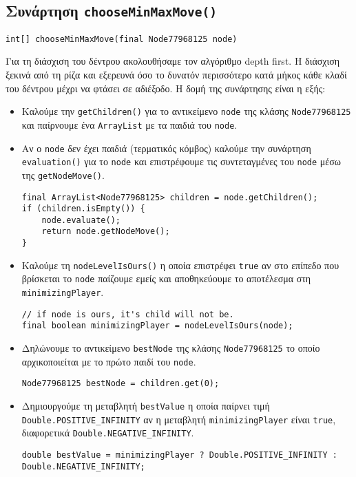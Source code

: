 \subsection{Συνάρτηση \texttt{chooseMinMaxMove()}}
\begin{lstlisting}[style=declaration]
int[] chooseMinMaxMove(final Node77968125 node)
\end{lstlisting}
Για τη διάσχιση του δέντρου ακολουθήσαμε τον αλγόριθμο depth first\cite{depth-first}.
Η διάσχιση ξεκινά από τη ρίζα και εξερευνά όσο το δυνατόν περισσότερο κατά μήκος κάθε κλαδί του δέντρου μέχρι να φτάσει σε αδιέξοδο.
Η δομή της συνάρτησης είναι η εξής:
\begin{itemize}
\item Καλούμε την \lstinline!getChildren()! για το αντικείμενο \lstinline!node! της κλάσης \lstinline!Node77968125! και παίρνουμε ένα
\lstinline!ArrayList! με τα παιδιά του \lstinline!node!.

\item Αν ο \lstinline!node! δεν έχει παιδιά (τερματικός κόμβος) καλούμε την
συνάρτηση \lstinline!evaluation()! για το \lstinline!node! και επιστρέφουμε τις συντεταγμένες του \lstinline!node! μέσω της \lstinline!getNodeMove()!.
\begin{lstlisting}[style=chunk]
final ArrayList<Node77968125> children = node.getChildren();
if (children.isEmpty()) {
    node.evaluate();
    return node.getNodeMove();
}
\end{lstlisting}

\item Καλούμε τη \lstinline!nodeLevelIsOurs()! η οποία επιστρέφει \lstinline!true! αν στο επίπεδο που βρίσκεται το
\lstinline!node! παίζουμε εμείς και αποθηκεύουμε το αποτέλεσμα στη
\lstinline!minimizingPlayer!.
\begin{lstlisting}[style=chunk]
// if node is ours, it's child will not be.
final boolean minimizingPlayer = nodeLevelIsOurs(node);
\end{lstlisting}

\item Δηλώνουμε το αντικείμενο \lstinline!bestNode! της κλάσης
\lstinline!Node77968125! το οποίο αρχικοποιείται με το πρώτο παιδί του \lstinline!node!.
\begin{lstlisting}[style=chunk]
Node77968125 bestNode = children.get(0);
\end{lstlisting}

\item \sloppy Δημιουργούμε
τη μεταβλητή \lstinline!bestValue! η οποία παίρνει τιμή \lstinline!Double.POSITIVE_INFINITY!
αν η μεταβλητή \lstinline!minimizingPlayer! είναι \lstinline!true!,
διαφορετικά \lstinline!Double.NEGATIVE_INFINITY!.
\begin{lstlisting}[style=chunk]
double bestValue = minimizingPlayer ? Double.POSITIVE_INFINITY : Double.NEGATIVE_INFINITY;
\end{lstlisting}


\end{itemize}
